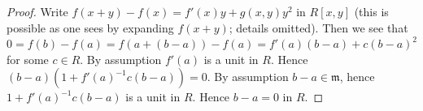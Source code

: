 \documentclass[10pt,a4paper]{amsart}
\theoremstyle{plain}
\theoremstyle{definition}
\theoremstyle{remark}
\numberwithin{equation}{subsection}
\begin{document}
\begin{proof}
Write $f(x + y) - f(x) = f'(x)y + g(x, y) y^2$ in $R[x, y]$ (this is possible
as one sees by expanding $f(x + y)$; details omitted).
Then we see that $0 = f(b) - f(a) = f(a + (b - a)) - f(a) =
f'(a)(b - a) + c (b - a)^2$ for some $c \in R$. By assumption
$f'(a)$ is a unit in $R$. Hence $(b - a)(1 + f'(a)^{-1}c(b - a)) = 0$.
By assumption $b - a \in \mathfrak m$, hence $1 + f'(a)^{-1}c(b - a)$
is a unit in $R$. Hence $b - a = 0$ in $R$.
\end{proof}
\end{document}
